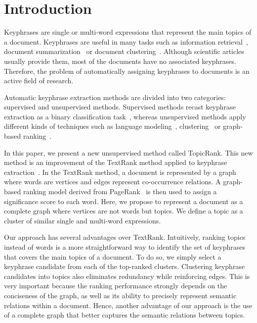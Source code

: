 \section{Introduction}
\label{sec:introduction}
  Keyphrases are single or multi-word expressions that represent the main topics
  of a document. Keyphrases are useful in many tasks such as information
  retrieval~\cite{medelyan2008smalltrainingset}, document
  summarization~\cite{litvak2008graphbased} or document
  clustering~\cite{han2007webdocumentclustering}. Although scientific articles
  usually provide them, most of the documents have no associated keyphrases.
  Therefore, the problem of automatically assigning keyphrases to documents is
  an active field of research.

  Automatic keyphrase extraction methods are divided into two categories:
  supervised and unsupervised methods. Supervised methods recast keyphrase
  extraction as a binary classification task~\cite{witten1999kea}, whereas
  unsupervised methods apply different kinds of techniques such as
  language modeling~\cite{tomokiyo2003languagemodel},
  clustering~\cite{liu2009keycluster} or graph-based
  ranking~\cite{mihalcea2004textrank}.

  In this paper, we present a new unsupervised method called TopicRank. This new
  method is an improvement of the TextRank method applied to keyphrase
  extraction~\cite{mihalcea2004textrank}. In the TextRank method, a document is
  represented by a graph where words are vertices and edges represent
  co-occurrence relations. A graph-based ranking model derived from
  PageRank~\cite{brin1998pagerank} is then used to assign a significance score
  to each word. Here, we propose to represent a document as a complete graph
  where vertices are not words but topics. We define a topic as a cluster of
  similar single and multi-word expressions.

  Our approach has several advantages over TextRank. Intuitively, ranking topics
  instead of words is a more straightforward way to identify the set of
  keyphrases that covers the main topics of a document. To do so, we simply
  select a keyphrase candidate from each of the top-ranked clusters. Clustering
  keyphrase candidates into topics also eliminates redundancy while reinforcing
  edges. This is very important because the ranking performance strongly depends
  on the conciseness of the graph, as well as its ability to precisely represent
  semantic relations within a document. Hence, another advantage of our approach
  is the use of a complete graph that better captures the semantic relations
  between topics.


